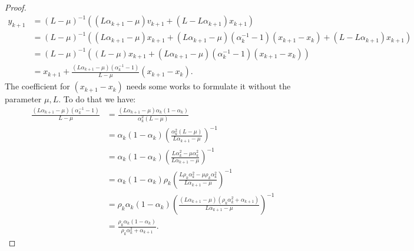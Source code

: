 \documentclass[12pt]{article}
\begin{document}
\begin{proof}
{            \begin{align*}
                y_{k + 1} &= 
                (L - \mu)^{-1}((L\alpha_{k + 1} - \mu)v_{k + 1} + (L - L \alpha_{k + 1})x_{k + 1})
                \\
                &= (L - \mu)^{-1}
                \left(
                    (L\alpha_{k + 1} - \mu)x_{k + 1} + 
                    (L\alpha_{k + 1} - \mu)(\alpha_k^{-1} - 1)(x_{k + 1} - x_k)
                    + (L - L \alpha_{k + 1})x_{k + 1}
                \right)
                \\
                &= 
                (L - \mu)^{-1}
                \left(
                    (L - \mu)x_{k + 1} + (L\alpha_{k + 1} - \mu)(\alpha_k^{-1} - 1)(x_{k + 1} - x_k)
                \right)
                \\
                &= x_{k + 1} + \frac{(L\alpha_{k + 1} - \mu)(\alpha_k^{-1} - 1)}{L - \mu}(x_{k + 1} - x_k). 
            \end{align*}
            }
            The coefficient for $(x_{k + 1} - x_k)$ needs some works to formulate it without the parameter $\mu, L$. 
            To do that we have: 
            \begin{align*}
                \frac{(L\alpha_{k + 1} - \mu)(\alpha_k^{-1} - 1)}{L - \mu}
                &= \frac{(L\alpha_{k + 1} - \mu)\alpha_k(1 - \alpha_k)}{\alpha_k^2(L - \mu)}
                \\
                &= 
                \alpha_k(1 - \alpha_k)
                \left(
                    \frac{\alpha_k^2(L - \mu)}{L\alpha_{k + 1} - \mu}
                \right)^{-1}
                \\
                &= \alpha_k(1 - \alpha_k)
                \left(
                    \frac{L\alpha_k^2 - \mu\alpha_k^2}{L\alpha_{k + 1} - \mu}
                \right)^{-1}
                \\
                &= 
                \alpha_k(1 - \alpha_k)
                \rho_k\left(
                    \frac{L\rho_k\alpha_k^2 - \mu\rho_k\alpha_k^2}{L\alpha_{k + 1} - \mu}
                \right)^{-1}
                \\
                &= 
                \rho_k\alpha_k(1 - \alpha_k)
                \left(
                    \frac{(L\alpha_{k + 1} - \mu)(\rho_k\alpha_k^2 + \alpha_{k + 1})}
                    {L\alpha_{k + 1} - \mu}
                \right)^{-1}
                \\
                &= \frac{\rho_k\alpha_k(1 - \alpha_k)}{\rho_k\alpha_k^2 + \alpha_{k + 1}}.

\end{align*}
\end{proof}
\end{document}
